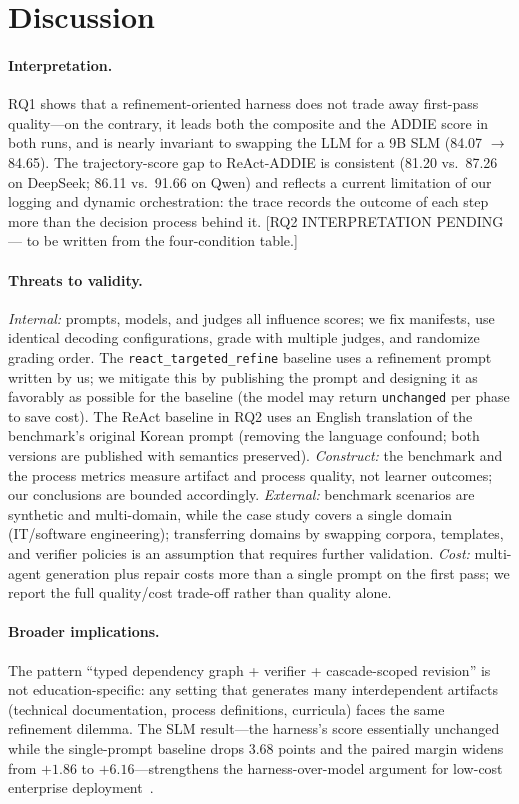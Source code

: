 \section{Discussion}
\label{sec:discussion}

\paragraph{Interpretation.}
RQ1 shows that a refinement-oriented harness does not trade away first-pass quality---on the contrary, it leads both the composite and the ADDIE score in both runs, and is nearly invariant to swapping the LLM for a 9B SLM (84.07 $\rightarrow$ 84.65). The trajectory-score gap to ReAct-ADDIE is consistent (81.20 vs.\ 87.26 on DeepSeek; 86.11 vs.\ 91.66 on Qwen) and reflects a current limitation of our logging and dynamic orchestration: the trace records the outcome of each step more than the decision process behind it. [RQ2 INTERPRETATION PENDING --- to be written from the four-condition table.]

\paragraph{Threats to validity.}
\emph{Internal:} prompts, models, and judges all influence scores; we fix manifests, use identical decoding configurations, grade with multiple judges, and randomize grading order. The \texttt{react\_targeted\_refine} baseline uses a refinement prompt written by us; we mitigate this by publishing the prompt and designing it as favorably as possible for the baseline (the model may return \texttt{unchanged} per phase to save cost). The ReAct baseline in RQ2 uses an English translation of the benchmark's original Korean prompt (removing the language confound; both versions are published with semantics preserved).
\emph{Construct:} the benchmark and the process metrics measure artifact and process quality, not learner outcomes; our conclusions are bounded accordingly.
\emph{External:} benchmark scenarios are synthetic and multi-domain, while the case study covers a single domain (IT/software engineering); transferring domains by swapping corpora, templates, and verifier policies is an assumption that requires further validation.
\emph{Cost:} multi-agent generation plus repair costs more than a single prompt on the first pass; we report the full quality/cost trade-off rather than quality alone.

\paragraph{Broader implications.}
The pattern ``typed dependency graph + verifier + cascade-scoped revision'' is not education-specific: any setting that generates many interdependent artifacts (technical documentation, process definitions, curricula) faces the same refinement dilemma. The SLM result---the harness's score essentially unchanged while the single-prompt baseline drops 3.68 points and the paired margin widens from $+1.86$ to $+6.16$---strengthens the harness-over-model argument for low-cost enterprise deployment~\cite{cho2026harness,belcak2025slm}.
